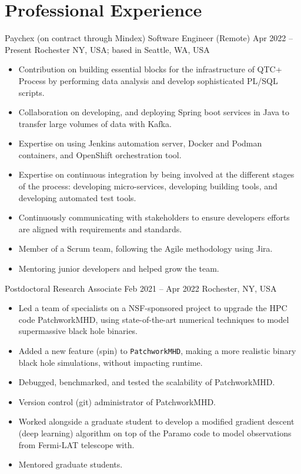 \section{\large Professional Experience}

\cventry{}%
{Paychex (on contract through Mindex)}%
{Software Engineer (Remote)}%
{Apr 2022 -- Present}%
{Rochester NY, USA; based in Seattle, WA, USA}%
{%
\begin{itemize}
	\item Contribution on building essential blocks for the infrastructure of QTC+ Process by performing data analysis and develop sophisticated PL/SQL scripts.
	\item Collaboration on developing, and deploying Spring boot services in Java to transfer large volumes of data with Kafka.
	\item Expertise on using Jenkins automation server, Docker and Podman containers, and OpenShift orchestration tool.
	\item Expertise on continuous integration by being involved at the different stages of the process: developing micro-services, developing building tools, and developing automated test tools.
	\item Continuously communicating with stakeholders to ensure developers efforts are aligned with requirements and standards.
	\item Member of a Scrum team, following the Agile methodology using Jira.
	\item Mentoring junior developers and helped grow the team.
\end{itemize}
}
\cventry{}%
{\RIT}%
{Postdoctoral Research Associate}%
{Feb 2021 -- Apr 2022}%
{Rochester, NY, USA}%
{%
\begin{itemize}
	\item Led a team of specialists on a NSF-sponsored project to upgrade the HPC code PatchworkMHD, using state-of-the-art numerical techniques to model supermassive black hole binaries.
	\item Added a new feature (spin) to \texttt{PatchworkMHD}, making a more realistic binary black hole simulations, without impacting runtime.
	\item Debugged, benchmarked, and tested the scalability of PatchworkMHD.
	\item Version control (git) administrator of PatchworkMHD.
	\item Worked alongside a graduate student to develop a modified gradient descent (deep learning) algorithm on top of the Paramo code to model observations from Fermi-LAT telescope with.
	\item Mentored graduate students.
\end{itemize}
}
